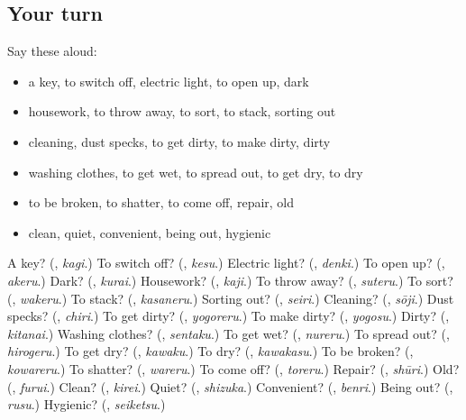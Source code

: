 \subsection*{Your turn}
Say these aloud:

\begin{itemize}
\raggedright
  \item a key, to switch off, electric light, to open up, dark
  \item housework, to throw away, to sort, to stack, sorting out
  \item cleaning, dust specks, to get dirty, to make dirty, dirty
  \item washing clothes, to get wet, to spread out, to get dry, to dry
  \item to be broken, to shatter, to come off, repair, old
  \item clean, quiet, convenient, being out, hygienic
\end{itemize}

\begin{tcolorbox}[breakable,colback=teal!4,colframe=teal!35!black,title={Before you move on}]
A key? (\textbf{}, \emph{kagi}.) To switch off? (\textbf{}, \emph{kesu}.) Electric light? (\textbf{}, \emph{denki}.) To open up? (\textbf{}, \emph{akeru}.) Dark? (\textbf{}, \emph{kurai}.) Housework? (\textbf{}, \emph{kaji}.) To throw away? (\textbf{}, \emph{suteru}.) To sort? (\textbf{}, \emph{wakeru}.) To stack? (\textbf{}, \emph{kasaneru}.) Sorting out? (\textbf{}, \emph{seiri}.) Cleaning? (\textbf{}, \emph{sōji}.) Dust specks? (\textbf{}, \emph{chiri}.) To get dirty? (\textbf{}, \emph{yogoreru}.) To make dirty? (\textbf{}, \emph{yogosu}.) Dirty? (\textbf{}, \emph{kitanai}.) Washing clothes? (\textbf{}, \emph{sentaku}.) To get wet? (\textbf{}, \emph{nureru}.) To spread out? (\textbf{}, \emph{hirogeru}.) To get dry? (\textbf{}, \emph{kawaku}.) To dry? (\textbf{}, \emph{kawakasu}.) To be broken? (\textbf{}, \emph{kowareru}.) To shatter? (\textbf{}, \emph{wareru}.) To come off? (\textbf{}, \emph{toreru}.) Repair? (\textbf{}, \emph{shūri}.) Old? (\textbf{}, \emph{furui}.) Clean? (\textbf{}, \emph{kirei}.) Quiet? (\textbf{}, \emph{shizuka}.) Convenient? (\textbf{}, \emph{benri}.) Being out? (\textbf{}, \emph{rusu}.) Hygienic? (\textbf{}, \emph{seiketsu}.)
\end{tcolorbox}
